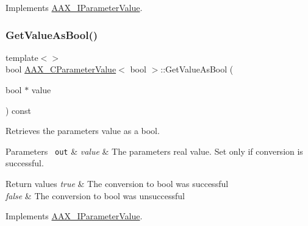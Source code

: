 Implements \mbox{\hyperlink{a01853_ad58947974003a0296540d18849d4350c}{A\+A\+X\+\_\+\+I\+Parameter\+Value}}.

\mbox{\label{a01533_a10763c0784f9e5e62fdadae47a54cee2}} 
\subsubsection{\texorpdfstring{GetValueAsBool()}{GetValueAsBool()}\hspace{0.1cm}{\footnotesize\ttfamily [2/2]}}
{\footnotesize\ttfamily template$<$$>$ \\
bool \mbox{\hyperlink{a01533}{A\+A\+X\+\_\+\+C\+Parameter\+Value}}$<$ bool $>$\+::Get\+Value\+As\+Bool (\begin{DoxyParamCaption}\item[{bool $\ast$}]{value }\end{DoxyParamCaption}) const\hspace{0.3cm}{\ttfamily [virtual]}}



Retrieves the parameter\textquotesingle{}s value as a bool. 


\begin{DoxyParams}[1]{Parameters}
\mbox{\texttt{ out}}  & {\em value} & The parameter\textquotesingle{}s real value. Set only if conversion is successful.\\
\hline
\end{DoxyParams}

\begin{DoxyRetVals}{Return values}
{\em true} & The conversion to bool was successful \\
\hline
{\em false} & The conversion to bool was unsuccessful \\
\hline
\end{DoxyRetVals}


Implements \mbox{\hyperlink{a01853_a5d792ea5770ace586d5de9e32f35773d}{A\+A\+X\+\_\+\+I\+Parameter\+Value}}.

\mbox{\label{a01533_a8df0b77c93c527392e51e3d82d026d87}} 
